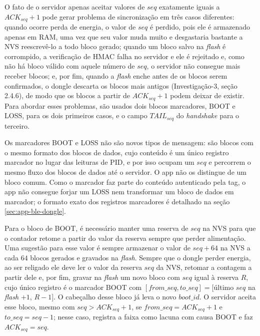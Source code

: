 \documentclass[
	12pt,
	article,			%
	oneside,
	a4paper,
	english,
	brazil				%
	]{abntex2}
\begin{document}
O fato de o servidor apenas aceitar valores de $seq$ exatamente iguais a $ACK_{seq} + 1$ pode gerar problema de sincronização em três casos diferentes: quando ocorre perda de energia, o valor de $seq$
é perdido, pois ele é armazenado apenas em RAM, uma vez que seu valor muda muito e desgastaria bastante a NVS reescrevê-lo a todo bloco gerado; quando um bloco salvo na \textit{flash} é corrompido,
a verificação de HMAC falha no servidor e ele é rejeitado e, como não há bloco válido com aquele número de $seq$, o servidor não consegue mais receber blocos; e, por fim, quando a \textit{flash} enche
antes de os blocos serem confirmados, o dongle descarta os blocos mais antigos (Investigação-3, seção 2.4.6), de modo que os blocos a partir de $ACK_{seq} + 1$ podem deixar de existir. Para abordar
esses problemas, são usados dois blocos marcadores, BOOT e LOSS, para os dois primeiros casos, e o campo $TAIL_{seq}$ do \textit{handshake} para o terceiro.

Os marcadores BOOT e LOSS não são novos tipos de mensagem: são blocos com o mesmo formato dos blocos de dados, cujo conteúdo é um único registro marcador no lugar das leituras de PID, e por isso
ocupam um $seq$ e percorrem o mesmo fluxo dos blocos de dados até o servidor. O app não os distingue de um bloco comum. Como o marcador faz parte do conteúdo autenticado pela tag, o app não consegue
forjar um LOSS nem transformar um bloco de dados em marcador; o formato exato dos registros marcadores é detalhado na seção \ref{sec:app-ble-dongle}.

Para o bloco de BOOT, é necessário manter uma reserva de $seq$ na NVS para que o contador retome a partir do valor da reserva sempre que perder alimentação. Uma sugestão para esse valor é sempre
armazenar o valor de $seq + 64$ na NVS a cada $64$ blocos gerados e gravados na \textit{flash}. Sempre que o dongle perder energia, ao ser religado ele deve ler o valor da reserva $seq$ da NVS, retomar a contagem a partir dele e,
por fim, gravar na \textit{flash} um novo bloco com $seq$ igual à reserva $R$, cujo único registro é o marcador BOOT com $[from\_seq, to\_seq] = [$último $seq$ na \textit{flash} $+ 1$, $R - 1]$. O
cabeçalho desse bloco já leva o novo $boot\_id$. O servidor aceita esse bloco, mesmo com $seq > ACK_{seq} + 1$, se $from\_seq = ACK_{seq} + 1$ e $to\_seq = seq - 1$; nesse caso, registra a faixa como
lacuna com causa BOOT e faz $ACK_{seq} = seq$.
\end{document}
